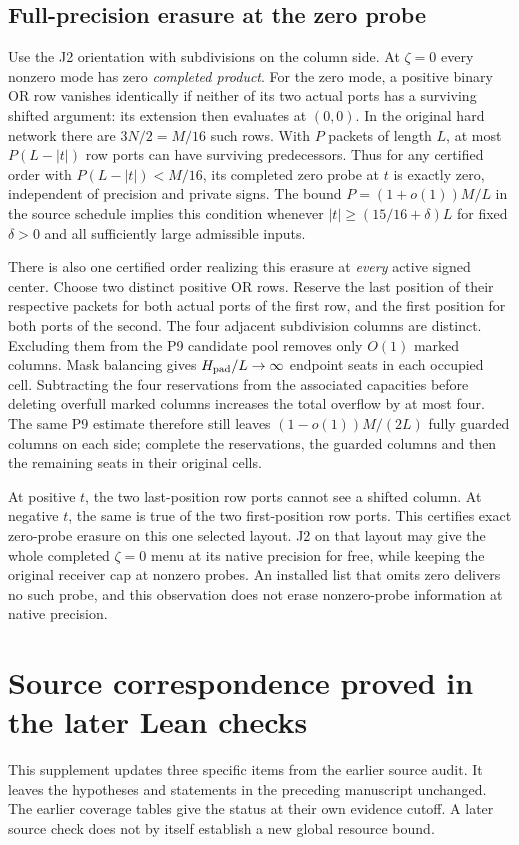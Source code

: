 \documentclass[
  11pt,
]{article}
\begin{document}
\subsection{Full-precision erasure at the zero probe}
Use the J2 orientation with subdivisions on the column side.
At \(\zeta=0\) every nonzero mode has zero \emph{completed product}.
For the zero mode, a positive binary OR row vanishes identically
if neither of its two actual ports has a surviving shifted argument:
its extension then evaluates at \((0,0)\). In the original hard
network there are \(3N/2=M/16\) such rows. With \(P\) packets of length
\(L\), at most \(P(L-|t|)\) row ports can have surviving predecessors.
Thus for any certified order with \(P(L-|t|)<M/16\), its completed
zero probe at \(t\) is exactly zero, independent of precision and
private signs. The bound \(P=(1+o(1))M/L\) in the source schedule
implies this condition whenever \(|t|\ge(15/16+\delta)L\) for fixed
\(\delta>0\) and all sufficiently large admissible inputs.

There is also one certified order realizing this erasure at
\emph{every} active signed center. Choose two distinct positive OR
rows. Reserve the last position of their respective packets for
both actual ports of the first row, and the first position for both
ports of the second. The four adjacent subdivision columns are
distinct. Excluding them from the P9 candidate pool removes only
\(O(1)\) marked columns. Mask balancing gives \(H_{\rm pad}/L\to\infty\)
endpoint seats in each occupied cell. Subtracting the four reservations
from the associated capacities before deleting overfull marked
columns increases the total overflow by at most four. The same P9
estimate therefore still leaves \((1-o(1))M/(2L)\) fully guarded
columns on each side; complete the reservations, the guarded columns
and then the remaining seats in their original cells.

At positive \(t\), the two last-position row ports cannot see a
shifted column. At negative \(t\), the same is true of the two
first-position row ports. This certifies exact zero-probe erasure
on this one selected layout. J2 on that layout may give the whole
completed \(\zeta=0\) menu at its native precision for free, while
keeping the original receiver cap at nonzero probes. An installed
list that omits zero delivers no such probe, and this observation
does not erase nonzero-probe information at native precision.


\clearpage
\section{Source correspondence proved in the later Lean checks}\label{r64-source-correspondence}
This supplement updates three specific items from the earlier source audit.
It leaves the hypotheses and statements in the preceding manuscript unchanged.
The earlier coverage tables give the status at their own evidence cutoff.
A later source check does not by itself establish a new global resource bound.
\end{document}
